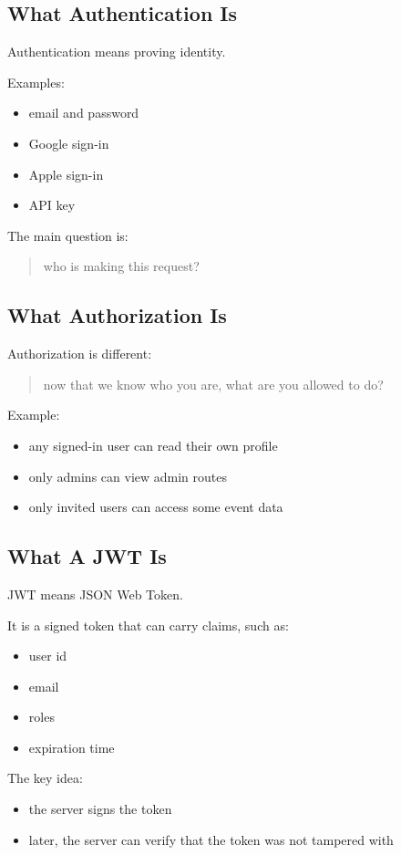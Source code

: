 \documentclass[11pt,a4paper]{article}
\begin{document}
\subsection{What Authentication Is}

Authentication means proving identity.

Examples:
\begin{itemize}
    \item email and password
    \item Google sign-in
    \item Apple sign-in
    \item API key
\end{itemize}

The main question is:
\begin{quote}
who is making this request?
\end{quote}

\subsection{What Authorization Is}

Authorization is different:
\begin{quote}
now that we know who you are, what are you allowed to do?
\end{quote}

Example:
\begin{itemize}
    \item any signed-in user can read their own profile
    \item only admins can view admin routes
    \item only invited users can access some event data
\end{itemize}

\subsection{What A JWT Is}

JWT means JSON Web Token.

It is a signed token that can carry claims, such as:
\begin{itemize}
    \item user id
    \item email
    \item roles
    \item expiration time
\end{itemize}

The key idea:
\begin{itemize}
    \item the server signs the token
    \item later, the server can verify that the token was not tampered with
\end{itemize}
\end{document}
